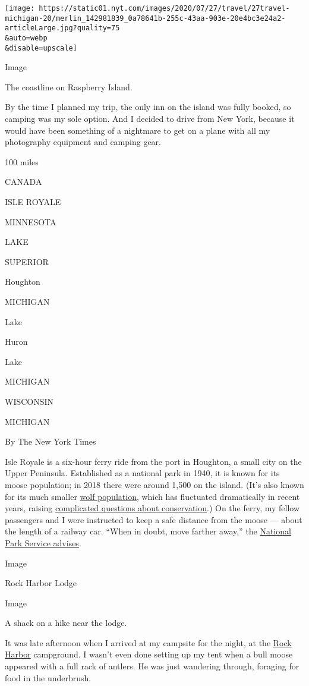 \texttt{[image: https://static01.nyt.com/images/2020/07/27/travel/27travel-michigan-20/merlin\_142981839\_0a78641b-255c-43aa-903e-20e4bc3e24a2-articleLarge.jpg?quality=75\\\&auto=webp\\\&disable=upscale]}

Image

The coastline on Raspberry Island.

By the time I planned my trip, the only inn on the island was fully
booked, so camping was my sole option. And I decided to drive from New
York, because it would have been something of a nightmare to get on a
plane with all my photography equipment and camping gear.

100 miles

CANADA

ISLE ROYALE

MINNESOTA

LAKE

SUPERIOR

Houghton

MICHIGAN

Lake

Huron

Lake

MICHIGAN

WISCONSIN

MICHIGAN

By The New York Times

Isle Royale is a six-hour ferry ride from the port in Houghton, a small
city on the Upper Peninsula. Established as a national park in 1940, it
is known for its moose population; in 2018 there were around 1,500 on
the island. (It's also known for its much smaller
\href{https://www.nps.gov/isro/learn/nature/wolf-moose-populations.htm}{wolf
population}, which has fluctuated dramatically in recent years, raising
\href{https://www.nytimes.com/2013/05/09/opinion/save-the-wolves-of-isle-royale-national-park.html}{complicated
questions about conservation}.) On the ferry, my fellow passengers and I
were instructed to keep a safe distance from the moose --- about the
length of a railway car. ``When in doubt, move farther away,'' the
\href{https://www.nps.gov/isro/learn/nature/moose.htm}{National Park
Service advises}.

Image

Rock Harbor Lodge

Image

A shack on a hike near the lodge.

It was late afternoon when I arrived at my campsite for the night, at
the \href{https://www.nps.gov/isro/planyourvisit/rock-harbor.htm}{Rock
Harbor} campground. I wasn't even done setting up my tent when a bull
moose appeared with a full rack of antlers. He was just wandering
through, foraging for food in the underbrush.

